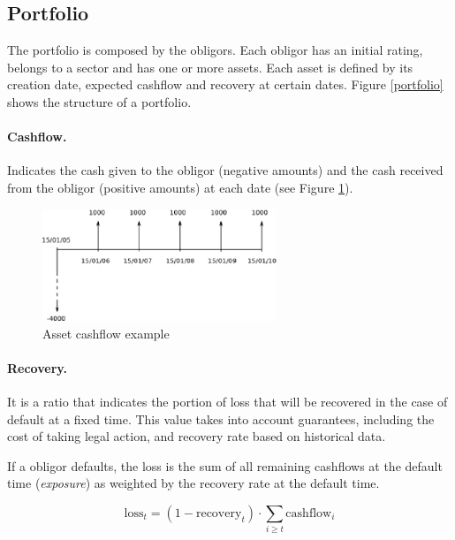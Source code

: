 \documentclass[a4paper,12pt,final]{article}
\begin{document}
\subsection{Portfolio}
The portfolio is composed by the obligors. Each obligor has an initial rating, 
belongs to a sector and has one or more assets. Each asset
is defined by its creation date, expected cashflow and recovery at certain 
dates. Figure \ref{portfolio} shows the structure of a portfolio.

\paragraph{Cashflow.} Indicates the cash given to the obligor (negative amounts) and the
cash received from the obligor (positive amounts) at each date (see Figure \ref{cashflow}).

\begin{figure}[!hbt]
\begin{center}
\includegraphics[width=7cm, angle=0]{./images/cashflow.eps}
\caption{Asset cashflow example}
\label{cashflow}
\end{center}
\end{figure}
\FloatBarrier

\paragraph{Recovery.} It is a ratio that indicates the portion of loss that will be recovered
in the case of default at a fixed time. This value takes into account guarantees, including 
the cost of taking legal action, and recovery rate based on historical data.
\newline

If a obligor defaults, the loss is the sum of all remaining cashflows at the default time 
(\emph{exposure}) as weighted by the recovery rate at the default time.

\begin{displaymath}
\mathrm{loss}_{t} = (1 - \mathrm{recovery}_t) \cdot \sum_{i \ge t} \mathrm{cashflow}_{i}
\end{displaymath}
\end{document}
